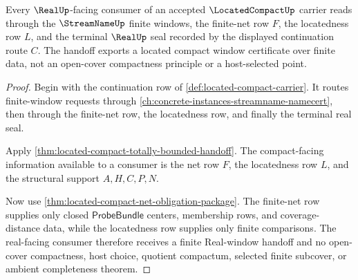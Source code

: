 \begin{theorem}
\label{thm:located-compact-real-window-handoff}
Every $\RealUp$-facing consumer of an accepted $\LocatedCompactUp$ carrier reads through the $\StreamNameUp$ finite windows, the finite-net row $F$, the locatedness row $L$, and the terminal $\RealUp$ seal recorded by the displayed continuation route $C$. The handoff exports a located compact window certificate over finite data, not an open-cover compactness principle or a host-selected point.
\end{theorem}
\begin{proof}
Begin with the continuation row of \autoref{def:located-compact-carrier}. It routes finite-window requests through \autoref{ch:concrete-instances-streamname-namecert}, then through the finite-net row, the locatedness row, and finally the terminal real seal.

Apply \autoref{thm:located-compact-totally-bounded-handoff}. The compact-facing information available to a consumer is the net row $F$, the locatedness row $L$, and the structural support $A,H,C,P,N$.

Now use \autoref{thm:located-compact-net-obligation-package}. The finite-net row supplies only closed $\mathsf{ProbeBundle}$ centers, membership rows, and coverage-distance data, while the locatedness row supplies only finite comparisons. The real-facing consumer therefore receives a finite Real-window handoff and no open-cover compactness, host choice, quotient compactum, selected finite subcover, or ambient completeness theorem.
\end{proof}

